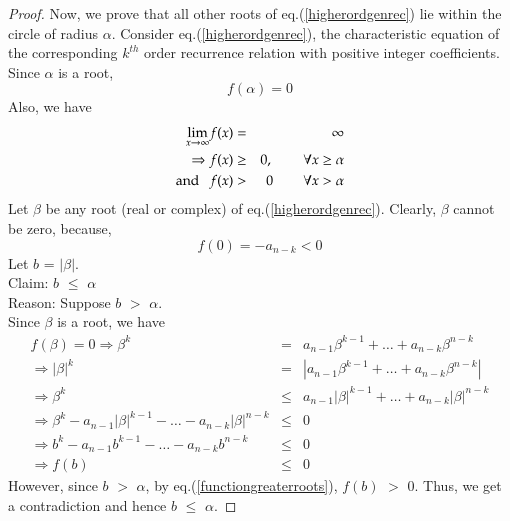 \begin{multicols}{2}
\begin{proof}
Now, we prove that all other roots of eq.(\ref{higherordgenrec}) lie within the circle of radius $\alpha$. Consider eq.(\ref{higherordgenrec}), the characteristic equation of the corresponding $k^{th}$ order recurrence relation with positive integer coefficients. Since $\alpha$ is a root, 
   \begin{equation}\nonumber
     f(\alpha) = 0
   \end{equation}
Also, we have
 \begin{eqnarray}
  \displaystyle{\lim_{x\rightarrow \infty}} f(x) &=& \infty \nonumber\\
  \Rightarrow  \label{functionroots} f(x) &\ge& 0, \hspace{0.3in} \forall x \ge \alpha \\
  \textup{and}\label{functiongreaterroots}\hspace{0.1in} f(x) &>& 0  \hspace{0.3in} \forall x > \alpha           
 \end{eqnarray}
Let $\beta$ be any root (real or complex) of eq.(\ref{higherordgenrec}). Clearly, $\beta$ cannot be zero, because,
 \begin{equation}\nonumber
 f(0) = -a_{n-k} < 0
  \end{equation}
Let $b$ = $|\beta|$.\\
Claim: $b$ $\le$ $\alpha$\\
Reason: Suppose $b$ $>$ $\alpha$.\\
 Since $\beta$ is a root, we have
 \begin{eqnarray}
 f(\beta) = 0 \Rightarrow \beta^{k}  &=&  a_{n-1}\beta^{k-1} + \ldots + a_{n-k}\beta^{n-k} \nonumber\\
              \Rightarrow |\beta|^{k}  &=&  |a_{n-1}\beta^{k-1} + \ldots + a_{n-k}\beta^{n-k}|\nonumber\\
             \Rightarrow \beta^{k}  &\leq&  a_{n-1}|\beta|^{k-1} + \ldots + a_{n-k}|\beta|^{n-k}\nonumber\\
              \Rightarrow \beta^{k}-a_{n-1}|\beta|^{k-1} - \ldots - a_{n-k}|\beta|^{n-k} &\leq& 0 \nonumber\\
              \Rightarrow b^{k}-a_{n-1}b^{k-1} - \ldots - a_{n-k}b^{n-k} &\leq& 0 \nonumber\\
  \label{functionlessthanzero} \Rightarrow f(b) &\leq& 0
 \end{eqnarray}
However, since $b$ $>$ $\alpha$, by eq.(\ref{functiongreaterroots}), $f(b)$ $>$ 0. Thus, we get a contradiction and hence $b$ $\le$ $\alpha$.


\end{proof}
\end{multicols}
